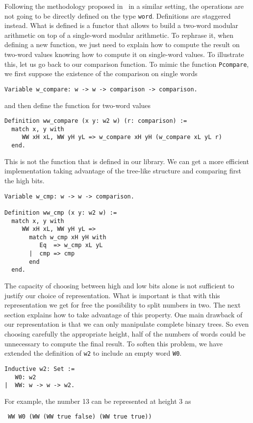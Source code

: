 Following the methodology proposed in~\cite{GreMa} in a similar setting, 
the operations are not going to be directly defined on the type {\tt word}.
Definitions are staggered instead. What is defined is a functor that 
allows to build a two-word modular arithmetic on top of a single-word modular
arithmetic. To rephrase it,
when defining a new function, we just need to explain how to compute the 
result on two-word values knowing how to compute it on single-word values.
To illustrate this, let us go back to our comparison function. 
To mimic the function {\tt Pcompare}, we first suppose the existence
of the comparison on single words
\begin{verbatim}
Variable w_compare: w -> w -> comparison -> comparison.
\end{verbatim}
and then define the function for two-word values
\begin{verbatim}
Definition ww_compare (x y: w2 w) (r: comparison) :=
  match x, y with
     WW xH xL, WW yH yL => w_compare xH yH (w_compare xL yL r) 
  end.
\end{verbatim}
This is not the function that is defined in our library. We can get
a more efficient implementation taking  advantage of the tree-like 
structure and comparing first the high bits.  
\begin{verbatim}
Variable w_cmp: w -> w -> comparison.

Definition ww_cmp (x y: w2 w) :=
  match x, y with
     WW xH xL, WW yH yL => 
       match w_cmp xH yH with 
          Eq  => w_cmp xL yL
       |  cmp => cmp
       end
  end. 
\end{verbatim}
The capacity of choosing between high and low bits alone is
not sufficient to justify our choice of representation. What
is important is that with this representation we get for free
the possibility to split numbers in two. The next section 
explains how to take advantage of this property.
One main drawback of our representation is that we can only manipulate
complete binary trees. So even choosing
carefully the appropriate height, half of the numbers of words could be unnecessary 
to compute the final result. 
To soften this problem, we have extended the definition of {\tt w2} to include an
empty word {\tt W0}. 
\begin{verbatim}
Inductive w2: Set :=  
   W0: w2
|  WW: w -> w -> w2.
\end{verbatim}
For example, the number 13 can be represented at height 3 as
\begin{verbatim}
 WW W0 (WW (WW true false) (WW true true))
\end{verbatim}
